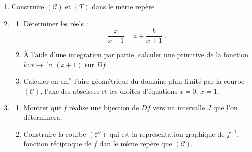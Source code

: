 \begin{enumerate}
\begin{enumerate}
                              au point d'abscisse $x_0 = 0$.
                  \end{enumerate}
            \item Construire $(\mathscr{C})$ et $(T)$ dans le m\^eme rep\`ere.
            \item \begin{enumerate}
                        \item D\'eterminer les r\'eels :
                              \[
                                    \frac{x}{x+1} = a + \frac{b}{x+1}       \;.
                              \]
                        \item \`A l'aide d'une integration par partie, calculer une primitive de la fonction 
                              $k : x \mapsto \ln (x+1)$ sur $Df$.
                        \item Calculer en $\mathrm{cm}^2$ l'aire g\'eom\'etrique du domaine plan 
                              limit\'e par la courbe $(\mathscr{C})$, l'axe des abscisses
                              et les droites d'\'equations $x=0$, $x=1$.
                  \end{enumerate}
            \item \begin{enumerate}
                        \item Montrer que $f$ r\'ealise une bijection de $Df$ 
                              vers un intervalle $J$ que l'on d\'eterminera.
                        \item Construire la courbe $(\mathscr{C}')$ qui est la repr\'esentation 
                              graphique de $f^{-1}$, fonction r\'eciproque de $f$ dan le m\^eme 
                              rep\`ere que $(\mathscr{C})$.
                  \end{enumerate}
      \end{enumerate}









